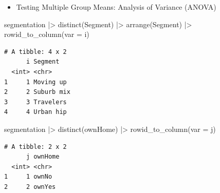 \documentclass[
  ignorenonframetext,
]{beamer}
\newenvironment{Shaded}{\begin{snugshade}}{\end{snugshade}}
\newcommand{\AttributeTok}[1]{\textcolor[rgb]{0.40,0.45,0.13}{#1}}
\newcommand{\FunctionTok}[1]{\textcolor[rgb]{0.28,0.35,0.67}{#1}}
\newcommand{\NormalTok}[1]{\textcolor[rgb]{0.00,0.23,0.31}{#1}}
\newcommand{\SpecialCharTok}[1]{\textcolor[rgb]{0.37,0.37,0.37}{#1}}
\newcommand{\StringTok}[1]{\textcolor[rgb]{0.13,0.47,0.30}{#1}}
\providecommand{\tightlist}{%
  \setlength{\itemsep}{0pt}\setlength{\parskip}{0pt}}\usepackage{longtable,booktabs,array}
\begin{document}
\begin{frame}[fragile]{}
\label{section-28}
\begin{itemize}
\tightlist
\item
  Testing Multiple Group Means: Analysis of Variance (ANOVA)
\end{itemize}

\tiny

\begin{Shaded}
\begin{Highlighting}[]
\NormalTok{segmentation }\SpecialCharTok{|\textgreater{}} 
  \FunctionTok{distinct}\NormalTok{(Segment) }\SpecialCharTok{|\textgreater{}} 
  \FunctionTok{arrange}\NormalTok{(Segment) }\SpecialCharTok{|\textgreater{}} 
  \FunctionTok{rowid\_to\_column}\NormalTok{(}\AttributeTok{var =} \StringTok{\textquotesingle{}i\textquotesingle{}}\NormalTok{)}
\end{Highlighting}
\end{Shaded}

\begin{verbatim}
# A tibble: 4 x 2
      i Segment   
  <int> <chr>     
1     1 Moving up 
2     2 Suburb mix
3     3 Travelers 
4     4 Urban hip 
\end{verbatim}

\tiny

\begin{Shaded}
\begin{Highlighting}[]
\NormalTok{segmentation }\SpecialCharTok{|\textgreater{}} 
  \FunctionTok{distinct}\NormalTok{(ownHome) }\SpecialCharTok{|\textgreater{}} 
  \FunctionTok{rowid\_to\_column}\NormalTok{(}\AttributeTok{var =} \StringTok{\textquotesingle{}j\textquotesingle{}}\NormalTok{)}
\end{Highlighting}
\end{Shaded}

\begin{verbatim}
# A tibble: 2 x 2
      j ownHome
  <int> <chr>  
1     1 ownNo  
2     2 ownYes 
\end{verbatim}
\end{frame}
\end{document}
